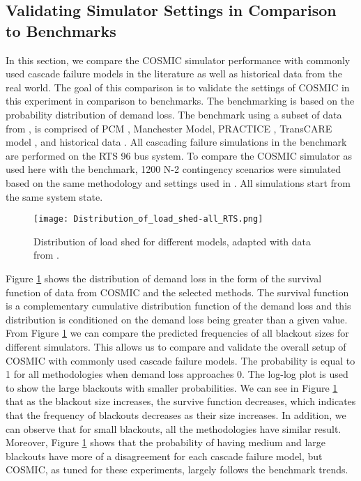 \documentclass[journal]{IEEEtran}
\begin{document}
\subsection{Validating Simulator Settings in Comparison to Benchmarks}
In this section, we compare the COSMIC simulator performance with commonly used cascade failure models in the literature as well as historical data from the real world. The goal of this comparison is to validate the settings of COSMIC in this experiment in comparison to benchmarks. The benchmarking is based on the probability distribution of demand loss. 
The benchmark using a subset of data from \cite{benchmark}, is comprised of PCM \cite{PCM}, Manchester Model\cite{manch}, PRACTICE \cite{pract}, TransCARE model \cite{Trans}, and historical data \cite{historical}. All cascading failure simulations in the benchmark are performed on the RTS 96 bus system.
To compare the COSMIC simulator as used here with the benchmark,  1200 N-2 contingency scenarios were simulated based on the same  methodology and settings used in \cite{benchmark}. All simulations start from the same system state. 

\begin{figure}[!t]
\centering
\texttt{[image: Distribution\_of\_load\_shed-all\_RTS.png]}
\caption{Distribution of load shed for different models, adapted with data from \cite{benchmark}.}
\label{fig: Distribution of load shed-orig}
\end{figure}


Figure \ref{fig: Distribution of load shed-orig} shows the distribution of demand loss in the form of the survival function of data from COSMIC and the selected methods. The survival function is a complementary cumulative distribution function of the demand loss and this distribution is conditioned on the demand loss being greater than a given value.  From Figure \ref{fig: Distribution of load shed-orig} we can compare the predicted frequencies of all blackout sizes for different simulators. This allows us to compare and validate the overall setup of COSMIC with commonly used cascade failure models. The probability is equal to 1 for all methodologies when demand loss approaches 0. The log-log plot is used to show the large blackouts with smaller probabilities. We can see in Figure \ref{fig: Distribution of load shed-orig} that as the blackout size increases, the survive function decreases, which indicates that the frequency of blackouts decreases as their size increases. In addition, we can observe that for small blackouts, all the methodologies have similar result. Moreover, Figure \ref{fig: Distribution of load shed-orig} shows that the probability of having medium and large blackouts have more of a disagreement for each cascade failure model, but COSMIC, as tuned for these experiments, largely follows the benchmark trends. 
\end{document}
